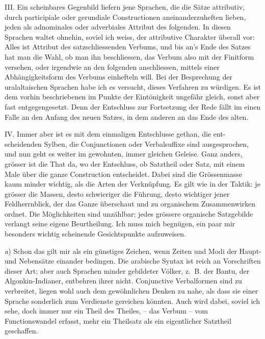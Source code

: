 III. Ein scheinbares Gegenbild liefern jene Sprachen, die die Sätze attributiv, durch participiale oder gerundiale Constructionen aneinanderzuheften lieben, jeden als adnominales oder adverbiales Attribut des folgenden. In diesen Sprachen waltet ohnehin, soviel ich weiss, der attributive Charakter überall vor: Alles ist Attribut des satzschliessenden Verbums, und bis an’s Ende des Satzes hat man die Wahl, ob man ihn beschliessen, das Verbum also mit der Finitform versehen, oder irgendwie an den folgenden anschliessen, mittels einer Abhängigkeitsform des Verbums einhefteln will. Bei der Besprechung der uralaltaischen Sprachen habe ich es versucht, dieses Verfahren zu würdigen. Es ist dem vorhin beschriebenen im Punkte der Eintönigkeit ungefähr gleich, sonst aber fast entgegengesetzt. Denn der Entschluss zur Fortsetzung der Rede fällt im einen Falle an den Anfang des neuen Satzes, in dem anderen an das Ende des alten.

IV. Immer aber ist es mit dem einmaligen Entschlusse gethan, die ent-\label{sp.466} scheidenden Sylben, die Conjunctionen oder Verbalsuffixe sind ausgesprochen, und nun geht es weiter im gewohnten, immer gleichen Geleise. Ganz anders, grösser ist die That da, wo der Entschluss, ob Satztheil oder Satz, mit einem Male über die ganze Construction entscheidet. Dabei sind die Grössenmasse kaum minder wichtig, als die Arten der Verknüpfung. Es gilt wie in der Taktik: je grösser die Massen, desto schwieriger die Führung, desto wichtiger jener Feldherrnblick, der das Ganze überschaut und zu organischem Zusammenwirken ordnet. Die Möglichkeiten sind unzählbar; jedes grössere organische Satzgebilde verlangt seine eigene Beurtheilung. Ich muss mich begnügen, ein paar mir besonders wichtig scheinende Gesichtspunkte aufzuweisen.

\textit{a}) Schon das gilt mir als ein günstiges Zeichen, wenn Zeiten und Modi der Haupt- und Nebensätze einander bedingen. Die arabische Syntax ist reich an Vorschriften dieser Art; aber auch Sprachen minder gebildeter Völker, z.~B. der Bantu, der Algonkin-Indianer, entbehren ihrer nicht. Conjunctive Verbalformen sind zu verbreitet, liegen wohl auch dem gewöhnlichen Denken zu nahe, als dass sie einer Sprache sonderlich zum Verdienste gereichen könnten. Auch wird dabei, soviel ich sehe, doch immer nur ein Theil des Theiles, – das Verbum – vom \label{fp.447} Functionswandel erfasst, mehr ein Theilsatz als ein eigentlicher Satztheil geschaffen.

